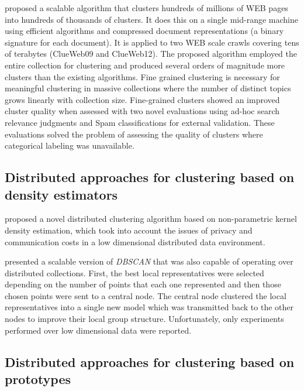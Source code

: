 \documentclass[10pt]{article}
\begin{document}
\citep{DDGN15} proposed a scalable algorithm that clusters hundreds of millions of WEB pages into hundreds of thousands of clusters. It does this on a single mid-range machine using efficient algorithms and compressed document representations (a binary signature for each document). It is applied to two WEB scale crawls covering tens of terabytes (ClueWeb09 and ClueWeb12). %
The proposed algorithm employed the entire collection for clustering and produced several orders of magnitude more clusters than the existing algorithms. Fine grained clustering is necessary for meaningful clustering in massive collections where the number of distinct topics grows linearly with collection size. Fine-grained clusters showed an improved cluster quality when assessed with two novel evaluations using ad-hoc search relevance judgments and Spam classifications for external validation. These evaluations solved the problem of assessing the quality of clusters where categorical labeling was unavailable.

\subsection{Distributed approaches for clustering based on density estimators}\label{sec:sa_dens}

\citep{KLM03} proposed a novel distributed clustering algorithm based on non-parametric kernel density estimation, which took into account the issues of privacy and communication costs in a low dimensional distributed data environment. %

\citep{JKP04} presented a scalable version of \textit{DBSCAN} that was also capable of operating over distributed collections. First, the best local representatives were selected depending on the number of points that each one represented and then those chosen points were sent to a central node. The central node clustered the local representatives into a single new model which was transmitted back to the other nodes to improve their local group structure. Unfortunately,
only experiments performed over low dimensional data were reported.

\subsection{Distributed approaches for clustering based on prototypes}\label{sec:sa_prot}
\end{document}
